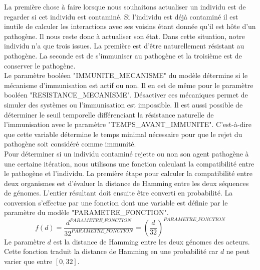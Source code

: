 La première chose à faire lorsque nous souhaitons actualiser un individu est de regarder si cet individu est contaminé. Si l'individu est déjà contaminé il est inutile de calculer les interactions avec ses voisins étant donnée qu'il est hôte d'un pathogène. Il nous reste donc à actualiser son état. Dans cette situation, notre individu n'a que trois issues. La première est d'être naturellement résistant au pathogène. La seconde est de s'immuniser au pathogène et la troisième est de conserver le pathogène.\\

Le paramètre booléen {\small "IMMUNITE\_MECANISME"} du modèle détermine si le mécanisme d'immunisation est actif ou non. Il en est de même pour le paramètre booléen {\small "RESISTANCE\_MECANISME"}. Désactiver ces mécaniques permet de simuler des systèmes ou l'immunisation est impossible. Il est aussi possible de déterminer le seuil temporelle différenciant la résistance naturelle de l'immunisation avec le paramètre {\small "TEMPS\_AVANT\_IMMUNITE"}. C'est-à-dire que cette variable détermine le temps minimal nécessaire pour que le rejet du pathogène soit considéré comme immunité.\\

Pour déterminer si un individu contaminé rejette ou non son agent pathogène à une certaine itération, nous utilisons une fonction calculant la compatibilité entre le pathogène et l'individu. La première étape pour calculer la compatibilité entre deux organismes est d'évaluer la distance de Hamming entre les deux séquences de génomes. L'entier résultant doit ensuite être converti en probabilité. La conversion s'effectue par une fonction dont une variable est définie par le paramètre du modèle {\small "PARAMETRE\_FONCTION"}.\\
$$
f(d) = \frac{d^{PARAMETRE\_FONCTION}}{32^{PARAMETRE\_FONCTION}} = (\frac{d}{32})^{PARAMETRE\_FONCTION}
$$
Le paramètre $d$ est la distance de Hamming entre les deux génomes des acteurs. Cette fonction traduit la distance de Hamming en une probabilité car $d$ ne peut varier que entre $[0,32]$.

